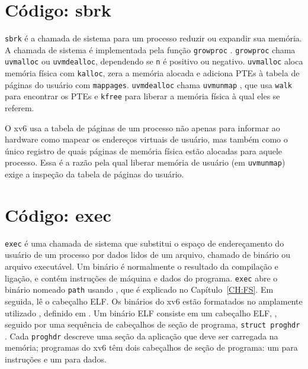 \section{Código: sbrk}

\lstinline{sbrk} é a chamada de sistema para um processo reduzir ou expandir sua memória.  
A chamada de sistema é implementada pela função \lstinline{growproc}  
.  
\lstinline{growproc} chama \lstinline{uvmalloc} ou \lstinline{uvmdealloc}, dependendo se \lstinline{n} é positivo ou negativo.  
\lstinline{uvmalloc}  
aloca memória física com {\tt kalloc}, zera a memória alocada e adiciona PTEs à tabela de páginas do usuário com {\tt mappages}.  
\lstinline{uvmdealloc} chama {\tt uvmunmap}  
,  
que usa {\tt walk} para encontrar os PTEs e {\tt kfree} para liberar a memória física à qual eles se referem.

O xv6 usa a tabela de páginas de um processo não apenas para informar ao hardware como mapear os endereços virtuais de usuário, mas também como o único registro de quais páginas de memória física 
estão alocadas para aquele processo.  
Essa é a razão pela qual liberar memória de usuário (em {\tt uvmunmap}) exige a inspeção da tabela de páginas do usuário.
\section{Código: exec}
\lstinline{exec} é uma chamada de sistema que substitui o espaço de endereçamento do usuário de um processo por dados lidos de um arquivo, chamado de binário ou arquivo executável.  
Um binário é normalmente o resultado da compilação e ligação, e contém instruções de máquina e dados do programa.  
\lstinline{exec}  abre o binário nomeado \lstinline{path} usando  , que é explicado no Capítulo~\ref{CH:FS}.  
Em seguida, lê o cabeçalho ELF. Os binários do xv6 estão formatados no amplamente utilizado , definido em .  
Um binário ELF consiste em um cabeçalho ELF,  , seguido por uma sequência de cabeçalhos de seção de programa,  
\lstinline{struct proghdr} .  
Cada \lstinline{proghdr} descreve uma seção da aplicação que deve ser carregada na memória; programas do xv6 têm dois cabeçalhos de seção de programa: um para instruções e um para dados.

